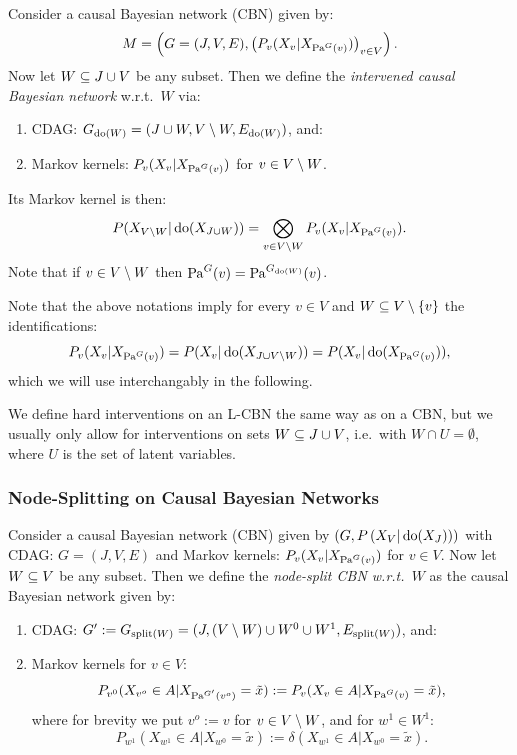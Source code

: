 \begin{Def}
    Consider a causal Bayesian network (CBN) given by: 
        \[ M= \left ( G=(J,V,E), \left ( P_v(X_v|X_{\mathrm{Pa}^G(v)}) \right )_{v \in V} \right ). \]
    Now let  $ W \subseteq J \cup V$ be any subset.
    Then we define the \emph{intervened causal Bayesian network} w.r.t.\ $W$ via:
    \begin{enumerate}
        \item CDAG: $G_{\operatorname{do}(W)} = (J \cup W, V \setminus W, E_{\operatorname{do}(W)}) $, and:
        \item Markov kernels: $P_v(X_v|X_{\mathrm{Pa}^G(v)})$ for $v \in V \setminus W$.
    \end{enumerate}
    Its \observational Markov kernel is then:
    \[ P(X_{V \setminus W}|\operatorname{do}(X_{J \cup W})) = \bigotimes_{v \in V\setminus W} P_v(X_v|X_{\mathrm{Pa}^G(v)}).  \]
    Note that if $ v\in V \setminus W$ then $\mathrm{Pa}^G(v) = \mathrm{Pa}^{G_{\operatorname{do}(W)}}(v)$.
\end{Def}

\begin{Rem}
    Note that the above notations imply for every $v \in V$ and $W \subseteq V \setminus \{ v \}$ the identifications:
    \[ P_v(X_v|X_{\mathrm{Pa}^G(v)}) =  P(X_v|\operatorname{do}(X_{J \cup V \setminus W})) = P(X_v|\operatorname{do}(X_{\mathrm{Pa}^G(v)})), \]
    which we will use interchangably in the following.
\end{Rem}


\begin{Rem}
We define hard interventions on an L-CBN the same way as on a CBN, but we usually 
only allow for interventions on sets $W \subseteq J \cup V$, i.e.\ with $W \cap U = \emptyset$, where $U$ is the set of latent variables.
\end{Rem}

\subsubsection{Node-Splitting on Causal Bayesian Networks}

\begin{Def}
    Consider a causal Bayesian network (CBN) given by $\left ( G, P\left ( X_V|\operatorname{do}(X_J)\right )\right )$ 
    with CDAG: $G=(J,V,E)$ and Markov kernels: $P_v(X_v|X_{\mathrm{Pa}^G(v)})$ for $v \in V$.
    Now let  $ W \subseteq V$ be any subset.
    Then we define the \emph{node-split CBN w.r.t.\ $W$} as the causal Bayesian network given by:
    \begin{enumerate}
      \item CDAG: $G':=G_{\mathrm{split}(W)} = (J, (V\setminus W) \cup W^0 \cup W^1,E_{\mathrm{split}(W)})$, and:
        \item Markov kernels for $v \in V$:
            \[ P_{v^0}(X_{v^o} \in A| X_{\mathrm{Pa}^{G'}(v^o)}=\tilde x) := P_v(X_v \in A|X_{\mathrm{Pa}^G(v)}=\tilde x), \]
          where for brevity we put $v^o:=v$ for $v \in V \setminus W$, and for $w^1 \in W^1$:
            \[ P_{w^1}(X_{w^1} \in A| X_{w^0}=\tilde x) := \delta(X_{w^1} \in A|X_{w^0}=\tilde x). \]
    \end{enumerate}
\end{Def}

